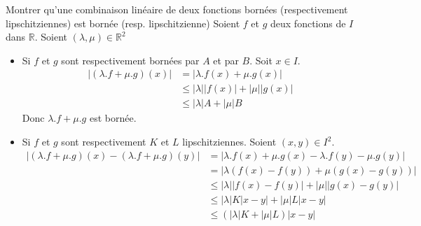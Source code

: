 \documentclass{article}
\begin{document}
\begin{question_kholle}{Montrer qu'une combinaison linéaire de deux fonctions bornées (respectivement lipschitziennes) est bornée (resp. lipschitzienne)}
	Soient $f$ et $g$ deux fonctions de $I$ dans $\mathbb{R}$. Soient $(\lambda, \mu) \in \mathbb{R}^2$
	\begin{itemize}[label=$\lozenge$]
		\item Si $f$ et $g$ sont respectivement bornées par $A$ et par $B$.
		      Soit $x \in I$.
		      \begin{align*}
			      \Big| (\lambda.f + \mu.g)(x) \Big| & = \Big| \lambda.f(x) + \mu.g(x) \Big|                                             \\
			                                         & \leqslant \big| \lambda \big|  \big|f(x)\big| + \big| \mu \big|  \big| g(x) \big| \\
			                                         & \leqslant \big| \lambda \big| A + \big| \mu \big| B
		      \end{align*}
		      Donc $\lambda.f + \mu.g$ est bornée.
		\item Si $f$ et $g$ sont respectivement $K$ et $L$ lipschitziennes.
		      Soient $(x, y) \in I^2$.
		      \begin{align*}
			      \Big| (\lambda.f + \mu.g)(x) - (\lambda.f + \mu.g)(y)\Big| & = \Big| \lambda.f(x) + \mu.g(x) - \lambda.f(y) - \mu.g(y) \Big|                                   \\
			                                                                 & = \Big| \lambda(f(x) - f(y)) + \mu(g(x) - g(y)) \Big|                                             \\
			                                                                 & \leqslant \Big| \lambda  \Big|  \Big| f(x) - f(y) \Big| + \Big| \mu \Big|  \Big|g(x) - g(y) \Big| \\
			                                                                 & \leqslant \Big| \lambda  \Big|  K \Big| x-y \Big| + \Big| \mu  \Big| L  \Big| x - y \Big|         \\
			                                                                 & \leqslant (|\lambda| K + |\mu|L ) |x - y|
		      \end{align*}
	\end{itemize}
\end{question_kholle}
\end{document}
